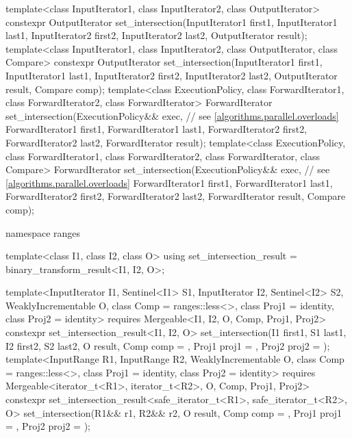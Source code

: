 \begin{codeblock}
{  template<class InputIterator1, class InputIterator2, class OutputIterator>
    constexpr OutputIterator
      set_intersection(InputIterator1 first1, InputIterator1 last1,
                       InputIterator2 first2, InputIterator2 last2,
                       OutputIterator result);
  template<class InputIterator1, class InputIterator2, class OutputIterator, class Compare>
    constexpr OutputIterator
      set_intersection(InputIterator1 first1, InputIterator1 last1,
                       InputIterator2 first2, InputIterator2 last2,
                       OutputIterator result, Compare comp);
  template<class ExecutionPolicy, class ForwardIterator1, class ForwardIterator2,
           class ForwardIterator>
    ForwardIterator
      set_intersection(ExecutionPolicy&& exec, // see \ref{algorithms.parallel.overloads}
                       ForwardIterator1 first1, ForwardIterator1 last1,
                       ForwardIterator2 first2, ForwardIterator2 last2,
                       ForwardIterator result);
  template<class ExecutionPolicy, class ForwardIterator1, class ForwardIterator2,
           class ForwardIterator, class Compare>
    ForwardIterator
      set_intersection(ExecutionPolicy&& exec, // see \ref{algorithms.parallel.overloads}
                       ForwardIterator1 first1, ForwardIterator1 last1,
                       ForwardIterator2 first2, ForwardIterator2 last2,
                       ForwardIterator result, Compare comp);

  namespace ranges {
    template<class I1, class I2, class O>
    using set_intersection_result = binary_transform_result<I1, I2, O>;

    template<InputIterator I1, Sentinel<I1> S1, InputIterator I2, Sentinel<I2> S2,
        WeaklyIncrementable O, class Comp = ranges::less<>, class Proj1 = identity, class Proj2 = identity>
      requires Mergeable<I1, I2, O, Comp, Proj1, Proj2>
      constexpr set_intersection_result<I1, I2, O>
        set_intersection(I1 first1, S1 last1, I2 first2, S2 last2, O result,
                         Comp comp = {}, Proj1 proj1 = {}, Proj2 proj2 = {});
    template<InputRange R1, InputRange R2, WeaklyIncrementable O,
        class Comp = ranges::less<>, class Proj1 = identity, class Proj2 = identity>
      requires Mergeable<iterator_t<R1>, iterator_t<R2>, O, Comp, Proj1, Proj2>
      constexpr set_intersection_result<safe_iterator_t<R1>, safe_iterator_t<R2>, O>
        set_intersection(R1&& r1, R2&& r2, O result,
                         Comp comp = {}, Proj1 proj1 = {}, Proj2 proj2 = {});
  }

}
\end{codeblock}
